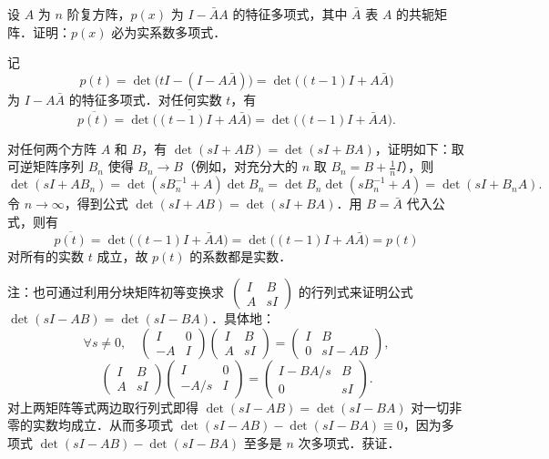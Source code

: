 设 $A$ 为 $n$ 阶复方阵，$p(x)$ 为 $I-\bar A A$ 的特征多项式，其中 $\bar A$ 表 $A$ 的共轭矩阵．证明：$p(x)$ 必为实系数多项式．

\begin{solution}
记
\[
  p(t)=\det\bigl(tI-(I-A\bar A)\bigr)=\det\bigl((t-1)I+A\bar A\bigr)
\]
为 $I-A\bar A$ 的特征多项式．对任何实数 $t$，有
\begin{equation}
  \overline{p(t)}=\overline{\det\bigl((t-1)I+A\bar A\bigr)}=\det\bigl((t-1)I+\bar A A\bigr).\tag{$*$}
\end{equation}

对任何两个方阵 $A$ 和 $B$，有 $\det(sI+AB)=\det(sI+BA)$，证明如下：取可逆矩阵序列 $B_n$ 使得 $B_n\to B$（例如，对充分大的 $n$ 取 $B_n=B+\frac1n I$），则
\[
  \det(sI+AB_n)=\det(sB_n^{-1}+A)\det B_n=\det B_n\det(sB_n^{-1}+A)=\det(sI+B_nA).
\]
令 $n\to\infty$，得到公式 $\det(sI+AB)=\det(sI+BA)$．用 $B=\bar A$ 代入公式，则有
\[
  \overline{p(t)}=\det\bigl((t-1)I+\bar A A\bigr)=\det\bigl((t-1)I+A\bar A\bigr)=p(t)
\]
对所有的实数 $t$ 成立，故 $p(t)$ 的系数都是实数．

注：也可通过利用分块矩阵初等变换求\ $\begin{pmatrix}I&B\\A&sI\end{pmatrix}$ 的行列式来证明公式 $\det(sI-AB)=\det(sI-BA)$．具体地：
\[
  \forall s\ne0,\quad
  \begin{pmatrix}I&0\\-A&I\end{pmatrix}
  \begin{pmatrix}I&B\\A&sI\end{pmatrix}
  =\begin{pmatrix}I&B\\0&sI-AB\end{pmatrix},
\]
\[
  \begin{pmatrix}I&B\\A&sI\end{pmatrix}
  \begin{pmatrix}I&0\\-A/s&I\end{pmatrix}
  =\begin{pmatrix}I-BA/s&B\\0&sI\end{pmatrix}.
\]
对上两矩阵等式两边取行列式即得 $\det(sI-AB)=\det(sI-BA)$ 对一切非零的实数均成立．从而多项式 $\det(sI-AB)-\det(sI-BA)\equiv0$，因为多项式 $\det(sI-AB)-\det(sI-BA)$ 至多是 $n$ 次多项式．获证．
\end{solution}

